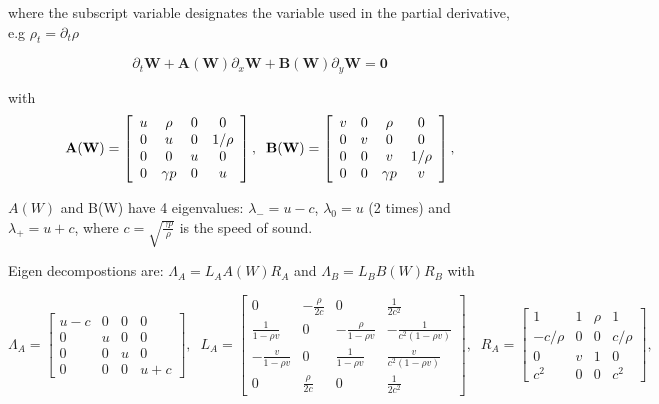 \documentclass{article}
\begin{document}
where the subscript variable designates the variable used in the partial derivative, e.g $\rho_t = \partial_t \rho$

\begin{equation}
  \partial_t \mathbf{W} + \mathbf{A(W)} \partial_x \mathbf{W} + \mathbf{B(W)} \partial_y \mathbf{W} = \mathbf{0}
\end{equation}

with
\begin{equation}
  \mathbf{A(W)} = \left[
    \begin{array}{c c c c}
      u & \rho     & 0 & 0 \\
      0 & u        & 0 & 1/\rho\\
      0 & 0        & u & 0 \\
      0 & \gamma p & 0 & u \\
    \end{array}
  \right],
  \;\;
  \mathbf{B(W)} = \left[
    \begin{array}{c c c c}
      v & 0 & \rho     & 0 \\
      0 & v & 0        & 0\\
      0 & 0 & v        & 1/\rho \\
      0 & 0 & \gamma p & v \\
    \end{array}
  \right],
\end{equation}

$A(W)$ and B(W) have 4 eigenvalues: $\lambda_{-}=u-c$, $\lambda_{0}=u$ (2 times) and $\lambda_{+}=u+c$, where $c=\sqrt{\frac{\gamma p}{\rho}}$ is the speed of sound. 

Eigen decompostions are: $\Lambda_A = L_A A(W) R_A$ and $\Lambda_B = L_B B(W) R_B$ with

\begin{equation}
  \Lambda_A = \left[
    \begin{array}{cccc}
      u-c& 0 & 0 & 0\\
      0  & u & 0 & 0\\
      0  & 0 & u & 0\\
      0  & 0 & 0 & u+c
    \end{array}
  \right],\;\;
  L_A = \left[
    \begin{array}{cccc}
      0                  & -\frac{\rho}{2c} & 0                & \frac{1}{2c^2}\\
      \frac{1}{1-\rho v} & 0                & -\frac{\rho}{1-\rho v} & -\frac{1}{c^2 (1-\rho v)}\\
     -\frac{v}{1-\rho v} & 0                & \frac{1}{1-\rho v}     &  \frac{v}{c^2 (1-\rho v)}\\
      0 & \frac{\rho}{2c}  & 0                & \frac{1}{2c^2}
    \end{array}
  \right],\;\;
  R_A = \left[
    \begin{array}{cccc}
      1       & 1 & \rho & 1\\
      -c/\rho & 0 & 0    & c/\rho\\
      0       & v & 1    & 0\\
      c^2     & 0 & 0    & c^2
    \end{array}
  \right],\;\;
\end{equation}
\end{document}
